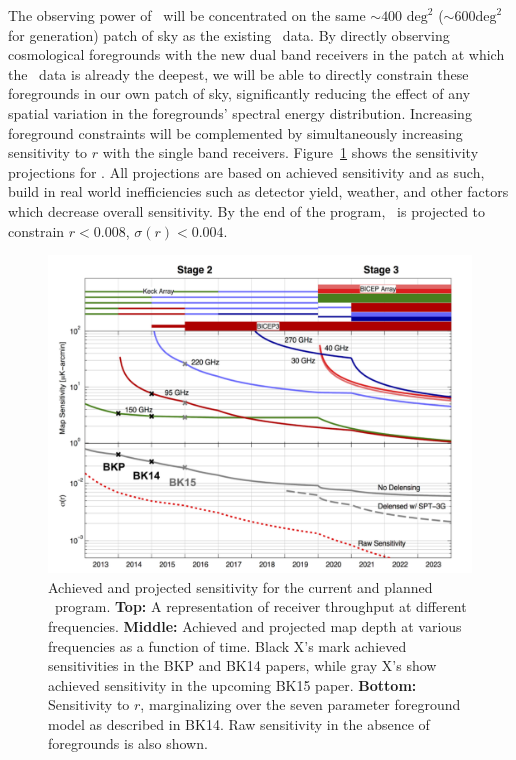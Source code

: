 \documentclass[]{spie}  %
\begin{document}
The observing power of \biceparray\ will be concentrated on the same $\sim400
\text{ deg}^2$ ($\sim 600 \text{deg}^2$ for  generation) patch of sky as the existing \bk\ data. By directly
observing cosmological foregrounds with the new dual band receivers in the
patch at which the \bk\ data is already the deepest, we will be able to
directly constrain these foregrounds in our own patch of sky, significantly
reducing the effect of any spatial variation in the foregrounds' spectral
energy distribution. Increasing foreground constraints will be complemented by
simultaneously increasing sensitivity to $r$ with the single band receivers. Figure~\ref{fig:projections} shows the sensitivity projections for \biceparray. All projections are based on achieved sensitivity and as such, build in real world inefficiencies such as detector yield, weather, and other factors which decrease overall sensitivity. By the end of the program, \biceparray\ is projected to constrain $r<0.008$, $\sigma (r)<0.004$.


\begin{figure}[hb]
\center
\includegraphics[scale=0.4]{projections.pdf}
\caption{Achieved and projected sensitivity for the current and planned \bk\
program. \textbf{Top:} A representation of receiver throughput at different
frequencies. \textbf{Middle:} Achieved and projected map depth at various
frequencies as a function of time. Black X's mark achieved sensitivities in the
BKP\cite{bkplanck} and BK14\cite{bk_vi} papers, while gray X's show achieved
sensitivity in the upcoming BK15 paper. \textbf{Bottom:} Sensitivity to $r$,
marginalizing over the seven parameter foreground model as described in BK14.
Raw sensitivity in the absence of foregrounds is also shown.}
\label{fig:projections}
\end{figure}









\end{document}
